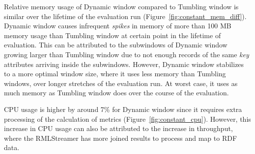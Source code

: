 Relative memory usage of Dynamic window compared to Tumbling window is similar over the lifetime of the 
evaluation run (Figure~\ref{fig:constant_mem_diff}). Dynamic window causes infrequent \emph{spikes} in memory of more 
than 100 MB memory usage than Tumbling window at certain point in the lifetime of evaluation. This can be attributed 
to the subwindows of Dynamic window growing larger than Tumbling window due to not enough records of the same 
\emph{key} attributes arriving inside the subwindows. However, Dynamic window stabilizes to a more optimal 
window size, where it uses less memory than Tumbling windows, over longer stretches of the evaluation run. At worst case, 
it uses as much memory as Tumbling window does over the course of the evaluation. 

CPU usage is higher by around 7\% for Dynamic window since it requires extra processing of the calculation of metrics 
(Figure~\ref{fig:constant_cpu}). 
However, this 
increase in CPU usage can also be attributed to the increase in throughput, where the RMLStreamer has more joined results 
to process and map to RDF data.  

